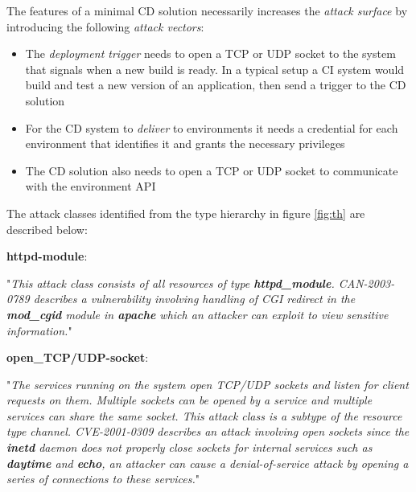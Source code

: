 The features of a minimal \acrshort{CD} solution necessarily increases the \textit{attack surface} by introducing the following \textit{attack vectors}:
\begin{itemize}
    \item The \textit{deployment trigger} needs to open a \acrshort{TCP} or \acrshort{UDP} socket to the system that signals when a new build is ready. In a typical setup a \acrshort{CI} system would build and test a new version of an application, then send a trigger to the \acrshort{CD} solution
    \item For the \acrshort{CD} system to \textit{deliver} to environments it needs a credential for each environment that identifies it and grants the necessary privileges
    \item The \acrshort{CD} solution also needs to open a \acrshort{TCP} or \acrshort{UDP} socket to communicate with the environment \acrshort{API}
\end{itemize}


The attack classes identified from the type hierarchy in figure \ref{fig:th} are described below:

\textbf{httpd-module}: \begin{displayquote}
"\textit{This attack class consists of all resources of type \textbf{httpd\_module}. CAN-2003-0789 describes a vulnerability  involving  handling  of  CGI  redirect  in  the \textbf{mod\_cgid} module in \textbf{apache} which an attacker can exploit to view sensitive information.}"\footnotemark[2]
\end{displayquote}

\pagebreak[1]
\textbf{open\_TCP/UDP-socket}: \begin{displayquote}
"\textit{The services  running  on  the system open TCP/UDP sockets and listen for client requests on them. Multiple sockets can be opened by a service and multiple services can share the same socket. This attack class is a subtype of the resource type channel. CVE-2001-0309 describes an attack involving open sockets since the \textbf{inetd} daemon does not properly close sockets for internal services such as \textbf{daytime} and \textbf{echo}, an attacker can cause a denial-of-service attack by opening a series of connections to these services.}"\footnotemark[2]
\end{displayquote}

